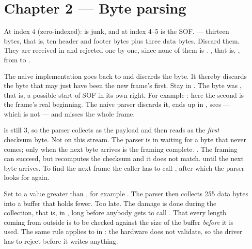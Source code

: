 \section*{Chapter 2 --- Byte parsing}

 At index 4 (zero-indexed):  is junk, and  at index 4--5 is
the SOF.
  --- thirteen bytes, that is, ten header and
footer bytes plus three data bytes.
 Discard them. They are received in  and rejected one by one, since none
of them is .
 , that is, , from  to
.

 The naive implementation goes back to  and discards the byte. It thereby
discards the byte that may just have been the new frame's first.
 Stay in . The byte was , that is, a possible start of SOF in
its own right.
 For example : here the second  is the frame's real
beginning. The naive parser discards it, ends up in , sees  --- which
is not  --- and misses the whole frame.

  is still 3, so the parser collects  as the payload and then
reads  as the \emph{first} checksum byte.
 Not on this stream. The parser is in  waiting for a byte that never
comes; only when the next byte arrives is the framing complete.
 . The framing can succeed, but  recomputes the
checksum and it does not match.
  until the next byte arrives. To find the next frame the caller has to
call , after which the parser looks for  again.

 Set  to a value greater than , for example
. The parser then collects 255 data bytes into a buffer that holds fewer.
 Too late. The damage is done during the collection, that is, in , long
before anybody gets to call .
 That every length coming from outside is to be checked against the size of the buffer
\emph{before} it is used. The same rule applies to  in : the
hardware does not validate, so the driver has to reject  before it writes anything.
